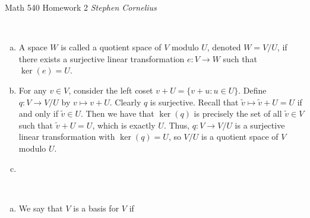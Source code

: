 \documentclass{article}
\begin{document}
\begin{center}
    Math 540
    \hfill Homework 2
    \hfill \textit{Stephen Cornelius}
\end{center}







\begin{problem} \\ 
   \begin{enumerate}[a)]
    \item A space $W$ is called a quotient space of $V$ modulo $U$, denoted $W = V/U$, if there exists a surjective linear transformation $e: V \to W$ such that $\ker(e) = U$.
    \item For any $v \in V$, consider the left coset $v + U = \{v + u : u \in U\}$. Define $q: V \to V/U$ by $v \mapsto v + U$. Clearly $q$ is surjective. Recall that $\tilde{v} \mapsto \tilde{v} + U = U$ if and only if $\tilde{v} \in U$. Then we have that $\ker(q)$ is precisely the set of all $\tilde{v} \in V$ such that $\tilde{v} + U = U$, which is exactly $U$. Thus, $q: V \to V/U$ is a surjective linear transformation with $\ker(q) = U$, so $V/U$ is a quotient space of $V$ modulo $U$.
    \item 
   \end{enumerate}
\end{problem}




\begin{problem} \\ 
   \begin{enumerate}[a)]
    \item We say that $V$ is a basis for $V$ if 
   \end{enumerate}
\end{problem}




\begin{problem}
   
\end{problem}
\end{document}
